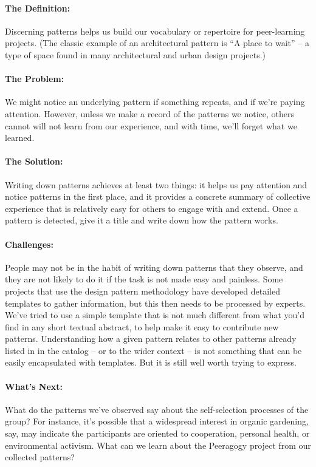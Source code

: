 \paragraph{The Definition:} Discerning patterns helps us build our
vocabulary or repertoire for peer-learning projects. (The classic
example of an architectural pattern is ``A place to wait'' -- a type of
space found in many architectural and urban design projects.)

\paragraph{The Problem:} We might notice an underlying pattern if something
repeats, and if we're paying attention. However, unless we make a record
of the patterns we notice, others cannot will not learn from our
experience, and with time, we'll forget what we learned.

\paragraph{The Solution:} Writing down patterns achieves at least two
things: it helps us pay attention and notice patterns in the first
place, and it provides a concrete summary of collective experience that
is relatively easy for others to engage with and extend. Once a pattern
is detected, give it a title and write down how the pattern works.

\paragraph{Challenges:} People may not be in the habit of writing down
patterns that they observe, and they are not likely to do it if the task
is not made easy and painless. Some projects that use the design pattern
methodology have developed detailed templates to gather information, but
this then needs to be processed by experts. We've tried to use a simple
template that is not much different from what you'd find in any short
textual abstract, to help make it easy to contribute new patterns.
Understanding how a given pattern relates to other patterns already
listed in in the catalog -- or to the wider context -- is not something
that can be easily encapsulated with templates. But it is still well
worth trying to express.

\paragraph{What's Next:} What do the patterns we've observed say about the
self-selection processes of the group? For instance, it's possible that
a widespread interest in organic gardening, say, may indicate the
participants are oriented to cooperation, personal health, or
environmental activism. What can we learn about the Peeragogy project
from our collected patterns?
